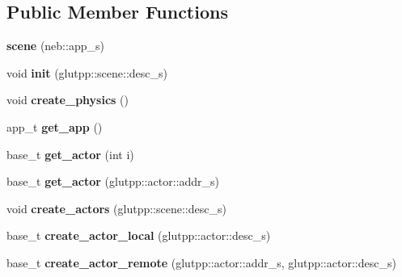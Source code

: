 \subsection*{\-Public \-Member \-Functions}
\begin{DoxyCompactItemize}
\item 
\hypertarget{classneb_1_1scene_1_1scene_abccb582576f45ce1b923bf6b6a153da6}{{\bfseries scene} (neb\-::app\-\_\-s)}\label{classneb_1_1scene_1_1scene_abccb582576f45ce1b923bf6b6a153da6}

\item 
\hypertarget{classneb_1_1scene_1_1scene_a44f7744f9e07ad6a8722689b3f8392b4}{void {\bfseries init} (glutpp\-::scene\-::desc\-\_\-s)}\label{classneb_1_1scene_1_1scene_a44f7744f9e07ad6a8722689b3f8392b4}

\item 
\hypertarget{classneb_1_1scene_1_1scene_a86d094b5dfff986da693d385c0f0f245}{void {\bfseries create\-\_\-physics} ()}\label{classneb_1_1scene_1_1scene_a86d094b5dfff986da693d385c0f0f245}

\item 
\hypertarget{classneb_1_1scene_1_1scene_a4a18d76291ad008be51b7fb8b22f1451}{app\-\_\-t {\bfseries get\-\_\-app} ()}\label{classneb_1_1scene_1_1scene_a4a18d76291ad008be51b7fb8b22f1451}

\item 
\hypertarget{classneb_1_1scene_1_1scene_aa6b526a0dfec00fa2ae1add784cf05f4}{base\-\_\-t {\bfseries get\-\_\-actor} (int i)}\label{classneb_1_1scene_1_1scene_aa6b526a0dfec00fa2ae1add784cf05f4}

\item 
\hypertarget{classneb_1_1scene_1_1scene_a70668d15ace0a19fb99f2a7de7b56b0d}{base\-\_\-t {\bfseries get\-\_\-actor} (glutpp\-::actor\-::addr\-\_\-s)}\label{classneb_1_1scene_1_1scene_a70668d15ace0a19fb99f2a7de7b56b0d}

\item 
\hypertarget{classneb_1_1scene_1_1scene_ad407feafc7a6378d8c05bbe7e0bd65df}{void {\bfseries create\-\_\-actors} (glutpp\-::scene\-::desc\-\_\-s)}\label{classneb_1_1scene_1_1scene_ad407feafc7a6378d8c05bbe7e0bd65df}

\item 
\hypertarget{classneb_1_1scene_1_1scene_a05681da591d690465575e63fbf192f6e}{base\-\_\-t {\bfseries create\-\_\-actor\-\_\-local} (glutpp\-::actor\-::desc\-\_\-s)}\label{classneb_1_1scene_1_1scene_a05681da591d690465575e63fbf192f6e}

\item 
\hypertarget{classneb_1_1scene_1_1scene_afe04b4b8f4d397595414c705a9ee751d}{base\-\_\-t {\bfseries create\-\_\-actor\-\_\-remote} (glutpp\-::actor\-::addr\-\_\-s, glutpp\-::actor\-::desc\-\_\-s)}\label{classneb_1_1scene_1_1scene_afe04b4b8f4d397595414c705a9ee751d}


\end{DoxyCompactItemize}

